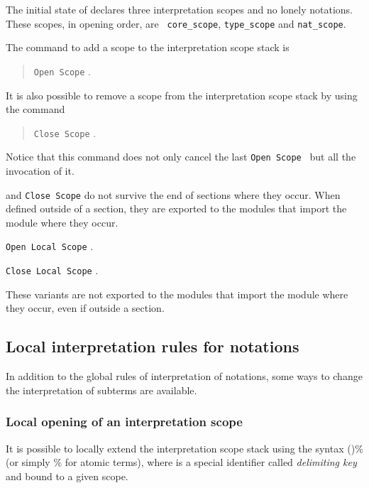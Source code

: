 The initial state of {\Coq} declares three interpretation scopes and
no lonely notations. These scopes, in opening order, are {\tt
core\_scope}, {\tt type\_scope} and {\tt nat\_scope}.

The command to add a scope to the interpretation scope stack is
\begin{quote}
{\tt Open Scope} {\scope}.
\end{quote}
It is also possible to remove a scope from the interpretation scope
stack by using the command
\begin{quote}
{\tt Close Scope} {\scope}.
\end{quote}
Notice that this command does not only cancel the last {\tt Open Scope
{\scope}} but all the invocation of it.

 and {\tt Close Scope} do not survive the end of
sections where they occur. When defined outside of a section, they are
exported to the modules that import the module where they occur.

\begin{Variants}

\item {\tt Open Local Scope} {\scope}.

\item {\tt Close Local Scope} {\scope}.

These variants are not exported to the modules that import the module
where they occur, even if outside a section.

\end{Variants}

\subsection{Local interpretation rules for notations}

In addition to the global rules of interpretation of notations, some
ways to change the interpretation of subterms are available.

\subsubsection{Local opening of an interpretation scope 
\label{scopechange}
\index{\%}
}

It is possible to locally extend the interpretation scope stack using
the syntax ({\term})\%{\delimkey} (or simply {\term}\%{\delimkey}
for atomic terms), where {\delimkey} is a special identifier called
{\em delimiting key} and bound to a given scope.

